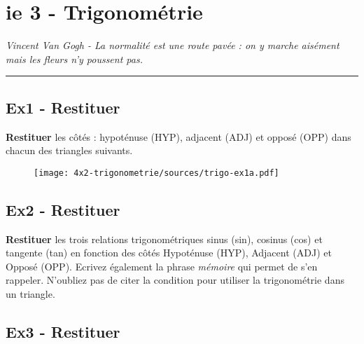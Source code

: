 \documentclass[12pt]{article}
\newcommand{\horrule}[1]{\rule{\linewidth}{#1}} %
\begin{document}

\newtheorem{Definition}{Définition}
\newtheorem{Theorem}{Théorème}
\newtheorem{Proposition}{Propriété}

\renewcommand{\labelitemi}{$\bullet$}
\renewcommand{\labelitemii}{$\circ$}

\setlength{\columnseprule}{1pt}

\section*{ie 3 - Trigonométrie}
\begin{center}
  \textit{Vincent Van Gogh - La normalité est une route pavée : on y marche aisément mais les fleurs n’y poussent pas.}
\end{center}
\horrule{2px}

\subsection*{Ex1 - Restituer}

\textbf{Restituer} les côtés : hypoténuse (HYP), adjacent (ADJ) et opposé (OPP) dans chacun des triangles suivants.

  \begin{figure}[H]
    \centering
    \texttt{[image: 4x2-trigonometrie/sources/trigo-ex1a.pdf]}
  \end{figure}



\subsection*{Ex2 - Restituer}

\textbf{Restituer} les trois relations trigonométriques sinus (sin), cosinus (cos) et tangente (tan) en fonction des côtés Hypoténuse (HYP), Adjacent (ADJ) et Opposé (OPP). Ecrivez également la phrase \textit{mémoire} qui permet de s'en rappeler. N'oubliez pas de citer la condition pour utiliser la trigonométrie dans un triangle.

\subsection*{Ex3 - Restituer}
\end{document}
